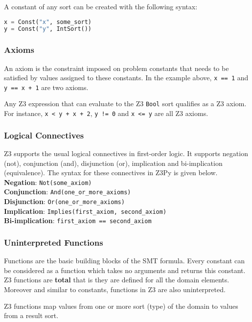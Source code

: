 A constant of any sort can be created with the following syntax:

\begin{lstlisting}[language=python]
x = Const("x", some_sort)
y = Const("y", IntSort())
\end{lstlisting}

\subsubsection{Axioms}
An axiom is the constraint imposed on problem constants that needs to be satisfied by values assigned to these constants. In the example above, \lstinline|x == 1| and \lstinline|y == x + 1| are two axioms.

Any Z3 expression that can evaluate to the Z3 \lstinline|Bool| sort qualifies as a Z3 axiom. For instance, \lstinline|x < y + x + 2|, \lstinline|y != 0| and \lstinline|x <= y| are all Z3 axioms.


\subsubsection{Logical Connectives}
Z3 supports the usual logical connectives in first-order logic. It supports negation (not), conjunction (and), disjunction (or), implication and bi-implication (equivalence). The syntax for these connectives in Z3Py is given below.\\
\textbf{Negation}: \lstinline|Not(some_axiom)|\\
\textbf{Conjunction}: \lstinline|And(one_or_more_axioms)|\\
\textbf{Disjunction}: \lstinline|Or(one_or_more_axioms)|\\
\textbf{Implication}: \lstinline|Implies(first_axiom, second_axiom)|\\
\textbf{Bi-implication}: \lstinline|first_axiom == second_axiom|\\


\subsubsection{Uninterpreted Functions}
Functions are the basic building blocks of the SMT formula. Every constant can be considered as a function which takes no arguments and returns this constant.
Z3 functions are \textbf{total} that is they are defined for all the domain elements. Moreover and similar to constants, functions in Z3 are also uninterpreted.

Z3 functions map values from one or more sort (type) of the domain to values from a result sort.

